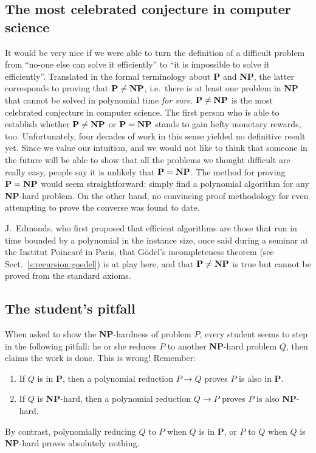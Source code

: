 \documentclass[a4paper]{book}
\theoremstyle{changebreak}                %
\begin{document}
\subsection{The most celebrated conjecture in computer science}
It would be very nice if we were able to turn the definition of a
difficult problem from ``no-one else can solve it efficiently'' to
``it is impossible to solve it efficiently''. Translated in the formal
terminology about {\bf P} and {\bf NP}, the latter corresponds to
proving that $\mbox{\bf P}\not=\mbox{\bf NP}$, i.e.~there is at least
one problem in {\bf NP} that cannot be solved in polynomial time {\it
  for sure}. $\mbox{\bf P}\not=\mbox{\bf NP}$ is the most celebrated
conjecture in computer science. The first person who is able to
establish whether $\mbox{\bf P}\not=\mbox{\bf NP}$ or $\mbox{\bf
  P}=\mbox{\bf NP}$ stands to gain hefty monetary rewards, too.
Unfortunately, four decades of work in this sense yielded no
definitive result yet. Since we value our intuition, and we would not
like to think that someone in the future will be able to show that all
the problems we thought difficult are really easy, people say it is
unlikely that $\mbox{\bf P}=\mbox{\bf NP}$. The method for proving
$\mbox{\bf P}=\mbox{\bf NP}$ would seem straightforward: simply find a
polynomial algorithm for any {\bf NP}-hard
problem. On the other hand, no
convincing proof methodology for even attempting to prove the converse
was found to date.

J.~Edmonds, who first proposed that efficient
algorithms are those that run in time bounded by a polynomial in the
instance size, once said during a seminar at the Institut Poincar\'e
in Paris, that G\"odel's incompleteness theorem (see
Sect.~\ref{s:recursion:goedel}) is at play here, and that $\mbox{\bf
  P}\not=\mbox{\bf NP}$ is true but cannot be proved from the standard
axioms.

\subsection{The student's pitfall}
When asked to show the {\bf NP}-hardness
of problem $P$, every student seems to step in the following pitfall:
he or she reduces $P$ to another {\bf NP}-hard problem $Q$, then
claims the work is done. This is wrong! Remember:
\begin{enumerate}
\item If $Q$ is in {\bf P}, then a polynomial reduction $P\to Q$ proves $P$ is
  also in {\bf P}.
\item If $Q$ is {\bf NP}-hard, then a polynomial reduction $Q\to P$
  proves $P$ is also {\bf NP}-hard.
\end{enumerate}
By contrast, polynomially reducing $Q$ to $P$ when $Q$ is in {\bf P},
or $P$ to $Q$ when $Q$ is {\bf NP}-hard proves absolutely nothing.
\end{document}
